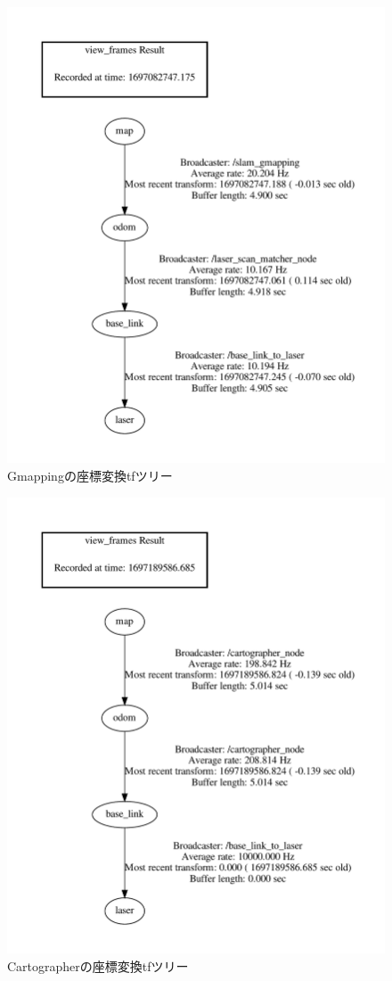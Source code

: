 \begin{figure}[h]
  \begin{center}
  \includegraphics[width=.8\linewidth]{img/slam_22.pdf}
  \caption{Gmappingの座標変換tfツリー}
  \label{slam:tf1}
  \end{center}
\end{figure}

\begin{figure}[h]
  \begin{center}
  \includegraphics[width=.8\linewidth]{img/slam_23.pdf}
  \caption{Cartographerの座標変換tfツリー}
  \label{slam:tf2}
  \end{center}
\end{figure}

